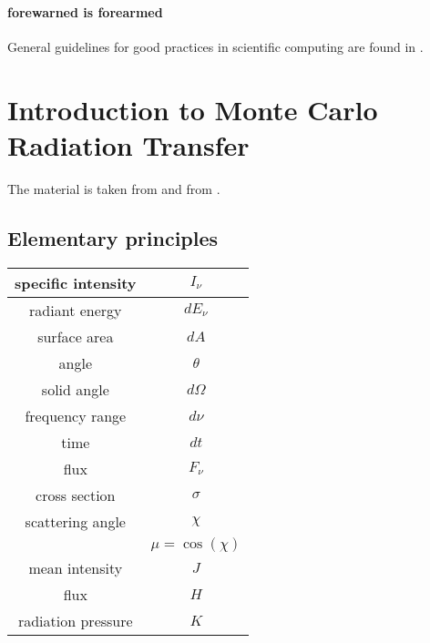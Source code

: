 \documentclass[../main/main.tex]{subfiles}
\begin{document}
\paragraph{forewarned is forearmed}
General guidelines for good practices in scientific computing are found in \cite{Wilson2014}.

\section{Introduction to Monte Carlo Radiation Transfer}
The material is taken from \cite{WWBW2001} and from \cite{WWBW2013}.

\subsection{Elementary principles}

\begin{center}
\centering
{\tabulinesep=1.5mm
\begin{tabu}{|c|c|}
\hline 
specific intensity & $I_{\nu}$ \\ \hline
radiant energy & $dE_{\nu}$ \\ \hline
surface area & $dA$ \\ \hline
angle & $\theta$ \\ \hline
solid angle & $d \Omega$ \\ \hline
frequency range & $d \nu$ \\ \hline
time & $dt$ \\ \hline
flux & $F_{\nu}$ \\ \hline
cross section & $\sigma$ \\ \hline
scattering angle & $\chi$ \\ 
 & $\mu = \cos(\chi)$ \\ \hline
mean intensity & $J$ \\ \hline
flux & $H$ \\ \hline
radiation pressure & $K$ \\ \hline
\end{tabu}}
\end{center}
\end{document}
